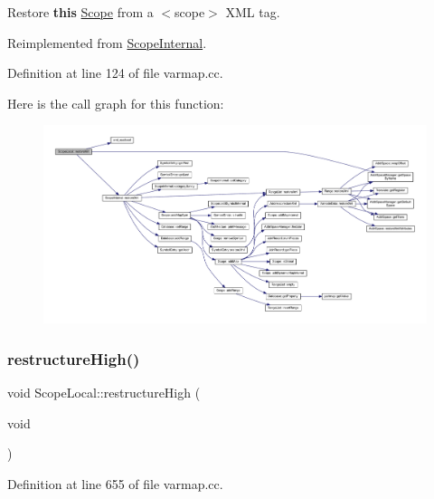 Restore {\bfseries{this}} \mbox{\hyperlink{class_scope}{Scope}} from a $<$scope$>$ X\+ML tag. 



Reimplemented from \mbox{\hyperlink{class_scope_internal_ad79bd78299b2bea6c0f4221682e81b07}{Scope\+Internal}}.



Definition at line 124 of file varmap.\+cc.

Here is the call graph for this function\+:
\nopagebreak
\begin{figure}[H]
\begin{center}
\leavevmode
\includegraphics[width=350pt]{class_scope_local_a5eeb1756bc706b8d5211fda106ad82ae_cgraph}
\end{center}
\end{figure}
\mbox{\label{class_scope_local_a308e308109ca1964d49d6a3a539a9acf}} 
\subsubsection{\texorpdfstring{restructureHigh()}{restructureHigh()}}
{\footnotesize\ttfamily void Scope\+Local\+::restructure\+High (\begin{DoxyParamCaption}\item[{void}]{ }\end{DoxyParamCaption})}



Definition at line 655 of file varmap.\+cc.

